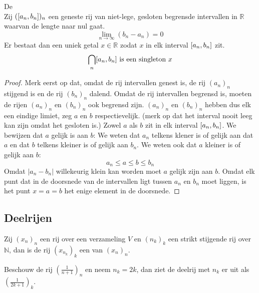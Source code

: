 \documentclass[main.tex]{subfiles}
\begin{document}
\begin{st}
  \label{st:geneste-intervallen}
  De \\
  Zij $(\interval{a_{n}}{b_{n}})_{n}$ een geneste rij van niet-lege, gesloten begrensde intervallen in $\mathbb{R}$ waarvan de lengte naar nul gaat.
  \[ \lim_{n \rightarrow \infty}(b_{n}-a_{n}) = 0 \]
  Er bestaat dan een uniek getal $x\in \mathbb{R}$ zodat $x$ in elk interval $\interval{a_{n}}{b_{n}}$ zit.
  \[ \bigcap_{n}\interval{a_{n}}{b_{n}} \text{ is een singleton } x \]

  \begin{proof}
    Merk eerst op dat, omdat de rij intervallen genest is, de rij $(a_{n})_{n}$ stijgend is en de rij $(b_{n})_{n}$ dalend.
    Omdat de rij intervallen begrensd is, moeten de rijen $(a_{n})_{n}$ en $(b_{n})_{n}$ ook begrensd zijn.
    $(a_{n})_{n}$ en $(b_{n})_{n}$ hebben dus elk een eindige limiet, zeg $a$ en $b$ respectievelijk.
    (merk op dat het interval nooit leeg kan zijn omdat het gesloten is.)
    Zowel $a$ als $b$ zit in elk interval $\interval{a_{n}}{b_{n}}$.
    We bewijzen dat $a$ gelijk is aan $b$:
    We weten dat $a_{n}$ telkens klener is of gelijk aan dat $a$ en dat $b$ telkens kleiner is of gelijk aan $b_{n}$.
    We weten ook dat $a$ kleiner is of gelijk aan $b$:
    \[ a_{n} \le a \le b \le b_{n} \]
    Omdat $|a_{n}-b_{n}|$ willekeurig klein kan worden moet $a$ gelijk zijn aan $b$.
    Omdat elk punt dat in de doorsnede van de intervallen ligt tussen $a_{n}$ en $b_{n}$ moet liggen, is het punt $x=a=b$ het enige element in de doorsnede.
  \end{proof}
\end{st}



\subsection{Deelrijen}
\label{sec:deelrijen}

\begin{de}
  Zij $(x_{n})_{n}$ een rij over een verzameling $V$ en $(n_{k})_{k}$ een strikt stijgende rij over $\mathbb{N}$, dan is de rij $(x_{n_{k}})_{k}$ een  van $(x_{n})_{n}$.
\end{de}

\begin{vb}
  Beschouw de rij $\left(\frac{1}{n+1}\right)_{n}$ en neem $n_{k} = 2k$, dan ziet de deelrij met $n_{k}$ er uit als $\left( \frac{1}{2k+1} \right)_{k}$.
\end{vb}
\end{document}
